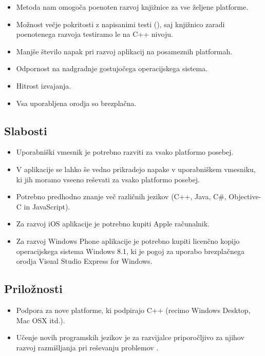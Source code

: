 \begin{itemize}
  \item Metoda nam omogoča poenoten razvoj knjižnice za vse željene platforme.
  \item Možnost večje pokritosti z napisanimi testi (), saj knjižnico zaradi poenotenega razvoja testiramo le na C++ nivoju.
  \item Manjše število napak pri razvoj aplikacij na posameznih platformah.
  \item Odpornost na nadgradnje gostujočega operacijskega sistema.
  \item Hitrost izvajanja.
  \item Vsa uporabljena orodja so brezplačna.
\end{itemize}

\subsection{Slabosti}

\begin{itemize}
  \item Uporabniški vmesnik je potrebno razviti za vsako platformo posebej.
  \item V aplikacije se lahko še vedno prikradejo napake v uporabniškem vmesniku, ki jih moramo vseeno reševati za vsako platformo posebej.
  \item Potrebno predhodno znanje več različnih jezikov (C++, Java, C\#, Objective-C in JavaScript).
  \item Za razvoj iOS aplikacije je potrebno kupiti Apple računalnik.
  \item Za razvoj Windows Phone aplikacije je potrebno kupiti licenčno kopijo operacijskega sistema Windows 8.1, ki je pogoj za uporabo brezplačnega orodja Visual Studio Express for Windows\cite{visual-studio-express}.
\end{itemize}

\subsection{Priložnosti}

\begin{itemize}
  \item Podpora za nove platforme, ki podpirajo C++ (recimo Windows Desktop, Mac OSX itd.).
  \item Učenje novih programskih jezikov je za razvijalce priporočljivo za njihov razvoj razmišljanja pri reševanju problemov \cite{pragprog}.
\end{itemize}

